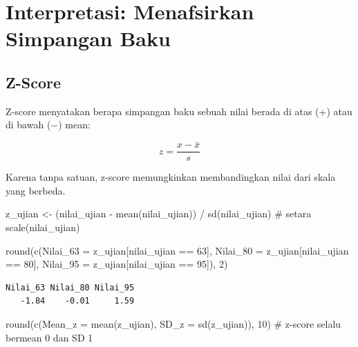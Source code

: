\documentclass[
  indonesian,
  letterpaper,
]{book}
\newenvironment{Shaded}{\begin{snugshade}}{\end{snugshade}}
\newcommand{\AttributeTok}[1]{\textcolor[rgb]{0.40,0.45,0.13}{#1}}
\newcommand{\CommentTok}[1]{\textcolor[rgb]{0.37,0.37,0.37}{#1}}
\newcommand{\DecValTok}[1]{\textcolor[rgb]{0.68,0.00,0.00}{#1}}
\newcommand{\FunctionTok}[1]{\textcolor[rgb]{0.28,0.35,0.67}{#1}}
\newcommand{\NormalTok}[1]{\textcolor[rgb]{0.00,0.23,0.31}{#1}}
\newcommand{\OtherTok}[1]{\textcolor[rgb]{0.00,0.23,0.31}{#1}}
\newcommand{\SpecialCharTok}[1]{\textcolor[rgb]{0.37,0.37,0.37}{#1}}
\begin{document}
\section{Interpretasi: Menafsirkan Simpangan
Baku}\label{interpretasi-menafsirkan-simpangan-baku}

\subsection{Z-Score}\label{z-score}

Z-score menyatakan berapa simpangan baku sebuah nilai berada di atas (+)
atau di bawah (−) mean:

\[z = \frac{x - \bar{x}}{s}\]

Karena tanpa satuan, z-score memungkinkan membandingkan nilai dari skala
yang berbeda.

\begin{Shaded}
\begin{Highlighting}[]
\NormalTok{z\_ujian }\OtherTok{\textless{}{-}}\NormalTok{ (nilai\_ujian }\SpecialCharTok{{-}} \FunctionTok{mean}\NormalTok{(nilai\_ujian)) }\SpecialCharTok{/} \FunctionTok{sd}\NormalTok{(nilai\_ujian)   }\CommentTok{\# setara scale(nilai\_ujian)}

\FunctionTok{round}\NormalTok{(}\FunctionTok{c}\NormalTok{(}\AttributeTok{Nilai\_63 =}\NormalTok{ z\_ujian[nilai\_ujian }\SpecialCharTok{==} \DecValTok{63}\NormalTok{],}
\AttributeTok{Nilai\_80 =}\NormalTok{ z\_ujian[nilai\_ujian }\SpecialCharTok{==} \DecValTok{80}\NormalTok{],}
\AttributeTok{Nilai\_95 =}\NormalTok{ z\_ujian[nilai\_ujian }\SpecialCharTok{==} \DecValTok{95}\NormalTok{]), }\DecValTok{2}\NormalTok{)}
\end{Highlighting}
\end{Shaded}

\begin{verbatim}
Nilai_63 Nilai_80 Nilai_95 
   -1.84    -0.01     1.59 
\end{verbatim}

\begin{Shaded}
\begin{Highlighting}[]
\FunctionTok{round}\NormalTok{(}\FunctionTok{c}\NormalTok{(}\AttributeTok{Mean\_z =} \FunctionTok{mean}\NormalTok{(z\_ujian), }\AttributeTok{SD\_z =} \FunctionTok{sd}\NormalTok{(z\_ujian)), }\DecValTok{10}\NormalTok{)   }\CommentTok{\# z{-}score selalu bermean 0 dan SD 1}
\end{Highlighting}
\end{Shaded}
\end{document}
